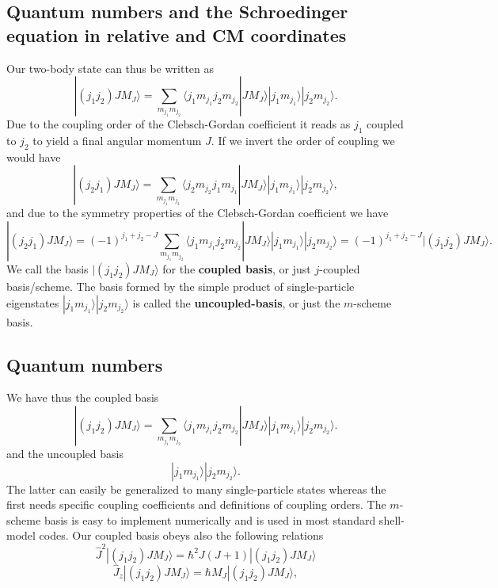 \documentclass[%
twoside,                 %
final,                   %
10pt]{article}
\begin{document}
\subsection{Quantum numbers and the Schroedinger equation in relative and CM coordinates}
\begin{block}{}
Our two-body state can thus be written as 
\[
|(j_1j_2)JM_J\rangle=\sum_{m_{j_1}m_{j_2}}\langle j_1m_{j_1}j_2m_{j_2}|JM_J\rangle|j_1m_{j_1}\rangle|j_2m_{j_2}\rangle.
\]
Due to the coupling order of the Clebsch-Gordan coefficient it reads as 
$j_1$ coupled to $j_2$ to yield a final angular momentum $J$. If we invert the order of coupling we would have
\[
|(j_2j_1)JM_J\rangle=\sum_{m_{j_1}m_{j_2}}\langle j_2m_{j_2}j_1m_{j_1}|JM_J\rangle|j_1m_{j_1}\rangle|j_2m_{j_2}\rangle,
\]
and due to the symmetry properties of the Clebsch-Gordan coefficient we have
\[
|(j_2j_1)JM_J\rangle=(-1)^{j_1+j_2-J}\sum_{m_{j_1}m_{j_2}}\langle j_1m_{j_1}j_2m_{j_2}|JM_J\rangle|j_1m_{j_1}\rangle|j_2m_{j_2}\rangle=(-1)^{j_1+j_2-J}|(j_1j_2)JM_J\rangle.
\]
We call the basis $|(j_1j_2)JM_J\rangle$ for the \textbf{coupled basis}, or just $j$-coupled basis/scheme. The basis formed by the simple product of single-particle eigenstates 
$|j_1m_{j_1}\rangle|j_2m_{j_2}\rangle$ is called the \textbf{uncoupled-basis}, or just the $m$-scheme basis. 
\end{block}

\subsection{Quantum numbers}
\begin{block}{}
We have thus the coupled basis 
\[
|(j_1j_2)JM_J\rangle=\sum_{m_{j_1}m_{j_2}}\langle j_1m_{j_1}j_2m_{j_2}|JM_J\rangle|j_1m_{j_1}\rangle|j_2m_{j_2}\rangle.
\]
and the uncoupled basis 
\[
|j_1m_{j_1}\rangle|j_2m_{j_2}\rangle.
\]
The latter can easily be generalized to many single-particle states whereas the first 
needs specific coupling coefficients and definitions of coupling orders. 
The $m$-scheme basis is easy to implement numerically and is used in most standard shell-model codes. 
Our coupled basis obeys also the following relations
\[
   \hat{J}^2|(j_1j_2)JM_J\rangle=\hbar^2J(J+1)|(j_1j_2)JM_J\rangle
\]
\[
   \hat{J}_z|(j_1j_2)JM_J\rangle=\hbar M_J|(j_1j_2)JM_J\rangle,
\]
\end{block}


\end{document}
